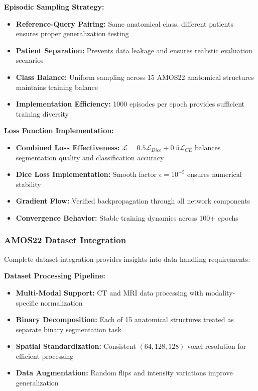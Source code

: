 \textbf{Episodic Sampling Strategy:}
\begin{itemize}
    \item \textbf{Reference-Query Pairing:} Same anatomical class, different patients ensures proper generalization testing
    \item \textbf{Patient Separation:} Prevents data leakage and ensures realistic evaluation scenarios
    \item \textbf{Class Balance:} Uniform sampling across 15 AMOS22 anatomical structures maintains training balance
    \item \textbf{Implementation Efficiency:} 1000 episodes per epoch provides sufficient training diversity
\end{itemize}

\textbf{Loss Function Implementation:}
\begin{itemize}
    \item \textbf{Combined Loss Effectiveness:} $\mathcal{L} = 0.5 \mathcal{L}_{Dice} + 0.5 \mathcal{L}_{CE}$ balances segmentation quality and classification accuracy
    \item \textbf{Dice Loss Implementation:} Smooth factor $\epsilon = 10^{-5}$ ensures numerical stability
    \item \textbf{Gradient Flow:} Verified backpropagation through all network components
    \item \textbf{Convergence Behavior:} Stable training dynamics across 100+ epochs
\end{itemize}

\subsubsection*{AMOS22 Dataset Integration}
Complete dataset integration provides insights into data handling requirements:

\textbf{Dataset Processing Pipeline:}
\begin{itemize}
    \item \textbf{Multi-Modal Support:} CT and MRI data processing with modality-specific normalization
    \item \textbf{Binary Decomposition:} Each of 15 anatomical structures treated as separate binary segmentation task
    \item \textbf{Spatial Standardization:} Consistent $(64, 128, 128)$ voxel resolution for efficient processing
    \item \textbf{Data Augmentation:} Random flips and intensity variations improve generalization
\end{itemize}

